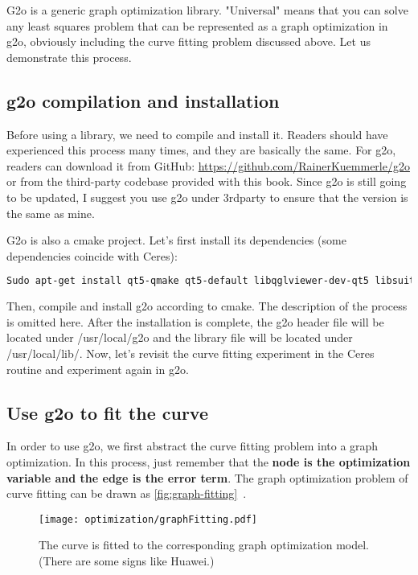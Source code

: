     G2o is a generic graph optimization library. "Universal" means that you can solve any least squares problem that can be represented as a graph optimization in g2o, obviously including the curve fitting problem discussed above. Let us demonstrate this process.
    
    \subsection{g2o compilation and installation}
    Before using a library, we need to compile and install it. Readers should have experienced this process many times, and they are basically the same. For g2o, readers can download it from GitHub: \url{https://github.com/RainerKuemmerle/g2o} or from the third-party codebase provided with this book. Since g2o is still going to be updated, I suggest you use g2o under 3rdparty to ensure that the version is the same as mine.
    
    G2o is also a cmake project. Let's first install its dependencies (some dependencies coincide with Ceres):
    \begin{lstlisting}[language=sh,caption=terminal input:]
    Sudo apt-get install qt5-qmake qt5-default libqglviewer-dev-qt5 libsuitesparse-dev libcxsparse3 libcholmod3
    \end{lstlisting}
    
    Then, compile and install g2o according to cmake. The description of the process is omitted here. After the installation is complete, the g2o header file will be located under /usr/local/g2o and the library file will be located under /usr/local/lib/. Now, let's revisit the curve fitting experiment in the Ceres routine and experiment again in g2o.
    
    \subsection{Use g2o to fit the curve}
    In order to use g2o, we first abstract the curve fitting problem into a graph optimization. In this process, just remember that the \textbf{node is the optimization variable and the edge is the error term}. The graph optimization problem of curve fitting can be drawn as \autoref{fig:graph-fitting}~.
    
    \begin{figure}[!ht]
    \centering
    \texttt{[image: optimization/graphFitting.pdf]}
    \caption{The curve is fitted to the corresponding graph optimization model. (There are some signs like Huawei.)}
    \label{fig:graph-fitting}
    \end{figure}
    
